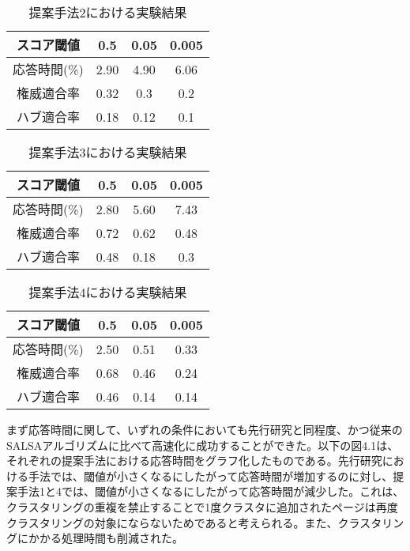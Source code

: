 \documentclass[a4paper,11pt]{jreport}
\begin{document}
\begin{table}[htb]
\begin{center}
\caption{提案手法2における実験結果}
\begin{tabular}{|c||c|c|c|} \hline 
    スコア閾値 & 0.5 & 0.05 & 0.005 \\ \hline \hline
    応答時間(\%) & 2.90 & 4.90 & 6.06 \\  \hline
    権威適合率 & 0.32 & 0.3 & 0.2 \\ \hline
    ハブ適合率 & 0.18 & 0.12 & 0.1 \\ \hline
\end{tabular}
\end{center}
\end{table}

\begin{table}[htb]
\begin{center}
\caption{提案手法3における実験結果}
\begin{tabular}{|c||c|c|c|} \hline 
    スコア閾値 & 0.5 & 0.05 & 0.005 \\ \hline \hline
    応答時間(\%) & 2.80 & 5.60 & 7.43 \\  \hline
    権威適合率 & 0.72 & 0.62 & 0.48 \\ \hline
    ハブ適合率 & 0.48 & 0.18 & 0.3 \\ \hline
\end{tabular}
\end{center}
\end{table}

\begin{table}[htb]
\begin{center}
\caption{提案手法4における実験結果}
\begin{tabular}{|c||c|c|c|} \hline 
    スコア閾値 & 0.5 & 0.05 & 0.005 \\ \hline \hline
    応答時間(\%) & 2.50 & 0.51 & 0.33 \\  \hline
    権威適合率 & 0.68 & 0.46 & 0.24 \\ \hline
    ハブ適合率 & 0.46 & 0.14 & 0.14 \\ \hline
\end{tabular}
\end{center}
\end{table}

まず応答時間に関して、いずれの条件においても先行研究と同程度、かつ従来のSALSAアルゴリズムに比べて高速化に成功することができた。以下の図4.1は、それぞれの提案手法における応答時間をグラフ化したものである。先行研究における手法では、閾値が小さくなるにしたがって応答時間が増加するのに対し、提案手法1と4では、閾値が小さくなるにしたがって応答時間が減少した。これは、クラスタリングの重複を禁止することで1度クラスタに追加されたページは再度クラスタリングの対象にならないためであると考えられる。また、クラスタリングにかかる処理時間も削減された。
\end{document}
